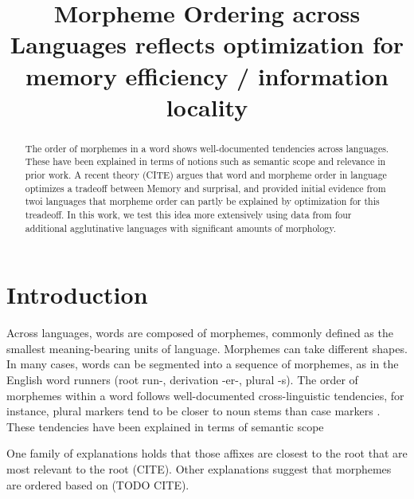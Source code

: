 \documentclass[11pt,letterpaper]{article}
\title{Morpheme Ordering across Languages reflects optimization for memory efficiency / information locality}
\begin{document}
\maketitle

\begin{abstract}
    The order of morphemes in a word shows well-documented tendencies across languages.
    These have been explained in terms of notions such as semantic scope and relevance in prior work.
A recent theory (CITE) argues that word and morpheme order in language optimizes a tradeoff between Memory and surprisal, and provided initial evidence from twoi languages that morpheme order can partly be explained by optimization for this treadeoff.
    In this work, we test this idea more extensively using data from four additional agglutinative languages with significant amounts of morphology.
    
    
\end{abstract}



\section{Introduction}

Across languages, words are composed of morphemes, commonly defined as the smallest meaning-bearing units of language.
Morphemes can take different shapes.
In many cases, words can be segmented into a sequence of morphemes, as in the English word runners (root run-, derivation -er-, plural -s).
The order of morphemes within a word follows well-documented cross-linguistic tendencies, for instance, plural markers tend to be closer to noun stems than case markers \citep[112]{greenberg1963universals}.
These tendencies have been explained in terms of semantic scope \citep{bybee-morphology-1985}


One family of explanations holds that those affixes are closest to the root that are most relevant to the root (CITE).
Other explanations suggest that morphemes are ordered based on (TODO CITE).
\end{document}
